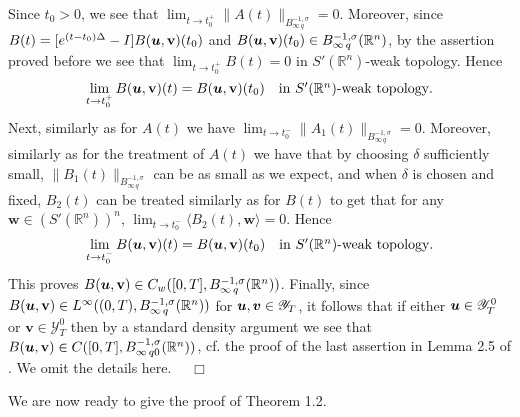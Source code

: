 \documentclass[11pt]{article}
\newcommand{\bfu}{{\mbox{\boldmath $u$}}}
\newcommand{\bfv}{{\mbox{\boldmath $v$}}}
\begin{document}
  Since $t_0>0$, we see that $\displaystyle\lim_{t\to t_0^+}\|A(t)\|_{B^{-1,\sigma}_{\infty\, q}}=0$. Moreover, since $B(t)=[e^{(t-t_0)\Delta}-I]
  B(\bfu,\mathbf{v})(t_0)$ and $B(\bfu,\mathbf{v})(t_0)\in B^{-1,\sigma}_{\infty\, q}(\mathbb{R}^n)$, by the assertion proved before we see that
  $\displaystyle\lim_{t\to t_0^+}B(t)=0$ in $S'(\mathbb{R}^n)$-weak topology. Hence
$$
  \lim_{t\to t_0^+}B(\bfu,\mathbf{v})(t)=B(\bfu,\mathbf{v})(t_0) \quad \mbox{in $S'(\mathbb{R}^n)$-weak topology}.
$$
  Next, similarly as for $A(t)$ we have $\displaystyle\lim_{t\to t_0^-}\|A_1(t)\|_{B^{-1,\sigma}_{\infty\, q}}=0$. Moreover, similarly as for the
  treatment of $A(t)$ we have that by choosing $\delta$ sufficiently small, $\|B_1(t)\|_{B^{-1,\sigma}_{\infty\, q}}$ can be as small as we expect,
  and when $\delta$ is chosen and fixed, $B_2(t)$ can be treated similarly as for $B(t)$ to get that for any $\mathbf{w}\in (S'(\mathbb{R}^n))^n$,
  $\displaystyle\lim_{t\to t_0^-}\langle B_2(t),\mathbf{w}\rangle=0$. Hence
$$
  \lim_{t\to t_0^-}B(\bfu,\mathbf{v})(t)=B(\bfu,\mathbf{v})(t_0) \quad \mbox{in $S'(\mathbb{R}^n)$-weak topology}.
$$
  This proves $B(\bfu,\mathbf{v})\in C_w([0,T],B^{-1,\sigma}_{\infty\, q}(\mathbb{R}^n))$. Finally, since $B(\bfu,\mathbf{v})\in
  L^{\infty}((0,T),B^{-1,\sigma}_{\infty\, q}(\mathbb{R}^n))$ for $\bfu,\bfv\in\mathscr{Y}_T$, it follows that if either $\bfu\in\mathscr{Y}_T^0$ or
  $\mathbf{v}\in\mathscr{Y}_T^0$ then by a standard density argument we see that $B(\bfu,\mathbf{v})\in C([0,T],B^{-1,\sigma}_{\infty\, q0}
  (\mathbb{R}^n))$, cf. the proof of the last assertion in Lemma 2.5 of \cite{Cui}. We omit the details here. $\quad\Box$
\medskip

  We are now ready to give the proof of Theorem 1.2.
\medskip
\end{document}
